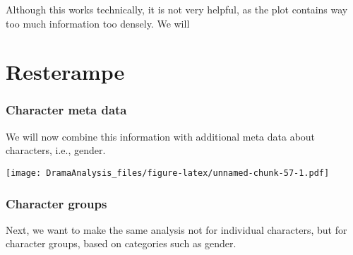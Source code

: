 \documentclass[]{book}
\newenvironment{Shaded}{\begin{snugshade}}{\end{snugshade}}
\newcommand{\CommentTok}[1]{\textcolor[rgb]{0.56,0.35,0.01}{\textit{#1}}}
\newcommand{\DataTypeTok}[1]{\textcolor[rgb]{0.13,0.29,0.53}{#1}}
\newcommand{\KeywordTok}[1]{\textcolor[rgb]{0.13,0.29,0.53}{\textbf{#1}}}
\newcommand{\NormalTok}[1]{#1}
\newcommand{\OperatorTok}[1]{\textcolor[rgb]{0.81,0.36,0.00}{\textbf{#1}}}
\begin{document}
Although this works technically, it is not very helpful, as the plot contains way too much information too densely. We will

\hypertarget{resterampe}{%
\chapter{Resterampe}\label{resterampe}}

\hypertarget{character-meta-data}{%
\subsection{Character meta data}\label{character-meta-data}}

We will now combine this information with additional meta data about characters, i.e., gender.

\begin{Shaded}
\end{Shaded}

\texttt{[image: DramaAnalysis\_files/figure-latex/unnamed-chunk-57-1.pdf]}

\hypertarget{character-groups}{%
\subsection{Character groups}\label{character-groups}}

Next, we want to make the same analysis not for individual characters, but for character groups, based on categories such as gender.
\end{document}
